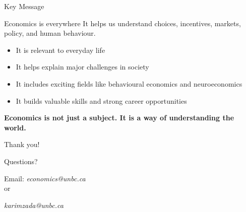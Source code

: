 \documentclass[aspectratio=169,11pt]{beamer}
\begin{document}
\begin{frame}{Key Message}
\begin{block}{Economics is everywhere}
It helps us understand choices, incentives, markets, policy, and human behaviour.
\end{block}
\vspace{0.4cm}
\begin{itemize}
    \item It is relevant to everyday life
    \item It helps explain major challenges in society
    \item It includes exciting fields like behavioural economics and neuroeconomics
    \item It builds valuable skills and strong career opportunities
\end{itemize}
\vspace{0.5cm}
\centering
\Large \textbf{Economics is not just a subject. It is a way of understanding the world.}
\end{frame}

\begin{frame}[plain]
\centering
\vfill
{\Huge Thank you!}\par
\vspace{0.5cm}
{\Large Questions?}

\vspace{.5cm}
Email: \textit{economics@unbc.ca}\\

or 

\textit{karimzada@unbc.ca}
\end{frame}
\end{document}
